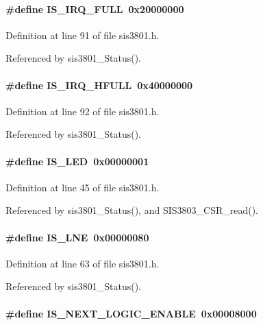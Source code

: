 \paragraph[{IS\_\-IRQ\_\-FULL}]{\setlength{\rightskip}{0pt plus 5cm}\#define IS\_\-IRQ\_\-FULL~0x20000000}\hfill\label{sis3801_8h_ad8dfd7dcaf068da671d73e67b255df66}


Definition at line 91 of file sis3801.h.

Referenced by sis3801\_\-Status().
\paragraph[{IS\_\-IRQ\_\-HFULL}]{\setlength{\rightskip}{0pt plus 5cm}\#define IS\_\-IRQ\_\-HFULL~0x40000000}\hfill\label{sis3801_8h_a2dbf24f998dad0b48d4273ea12b4437d}


Definition at line 92 of file sis3801.h.

Referenced by sis3801\_\-Status().
\paragraph[{IS\_\-LED}]{\setlength{\rightskip}{0pt plus 5cm}\#define IS\_\-LED~0x00000001}\hfill\label{sis3801_8h_a1675b13057e5ae3fb361e87d4053de4b}


Definition at line 45 of file sis3801.h.

Referenced by sis3801\_\-Status(), and SIS3803\_\-CSR\_\-read().
\paragraph[{IS\_\-LNE}]{\setlength{\rightskip}{0pt plus 5cm}\#define IS\_\-LNE~0x00000080}\hfill\label{sis3801_8h_ae9a8ae280598308f08d633cfa2880b88}


Definition at line 63 of file sis3801.h.

Referenced by sis3801\_\-Status().
\paragraph[{IS\_\-NEXT\_\-LOGIC\_\-ENABLE}]{\setlength{\rightskip}{0pt plus 5cm}\#define IS\_\-NEXT\_\-LOGIC\_\-ENABLE~0x00008000}\hfill\label{sis3801_8h_a77fc00367bc86606cc96675723faa358}


